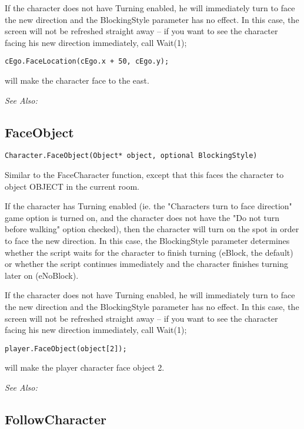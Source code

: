 If the character does not have Turning enabled, he will immediately turn to face the
new direction and the BlockingStyle parameter has no effect. In this case, the screen
will not be refreshed straight away -- if you want to see the character facing his new direction
immediately, call  Wait(1);

\begin{verbatim}
cEgo.FaceLocation(cEgo.x + 50, cEgo.y);
\end{verbatim}
will make the character face to the east.

\it{See Also:} 


\subsection{FaceObject}\label{Character.FaceObject}%

\begin{verbatim}
Character.FaceObject(Object* object, optional BlockingStyle)
\end{verbatim}
Similar to the FaceCharacter function, except that this faces the character
to object OBJECT in the current room.

If the character has Turning enabled (ie. the "Characters turn to face direction" game
option is turned on, and the character does not have the "Do not turn before walking"
option checked), then the character will turn on the spot in order to face the new direction.
In this case, the BlockingStyle parameter determines whether the script waits for the
character to finish turning (eBlock, the default) or whether the script continues immediately
and the character finishes turning later on (eNoBlock).

If the character does not have Turning enabled, he will immediately turn to face the
new direction and the BlockingStyle parameter has no effect. In this case, the screen
will not be refreshed straight away -- if you want to see the character facing his new direction
immediately, call  Wait(1);

\begin{verbatim}
player.FaceObject(object[2]);
\end{verbatim}
will make the player character face object 2.

\it{See Also:} 


\subsection{FollowCharacter}\label{Character.FollowCharacter}%

